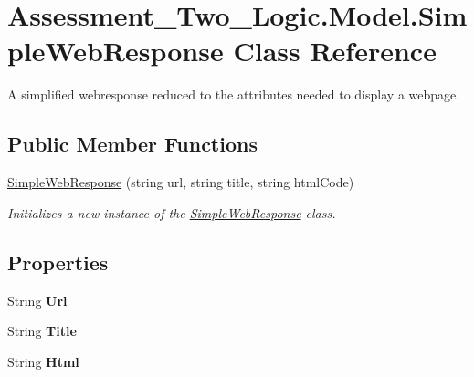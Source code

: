 \hypertarget{class_assessment___two___logic_1_1_model_1_1_simple_web_response}{
\section{Assessment\_\-Two\_\-Logic.Model.SimpleWebResponse Class Reference}
\label{class_assessment___two___logic_1_1_model_1_1_simple_web_response}
}


A simplified webresponse reduced to the attributes needed to display a webpage.  


\subsection*{Public Member Functions}
\begin{DoxyCompactItemize}
\item 
\hyperlink{class_assessment___two___logic_1_1_model_1_1_simple_web_response_a2ab4d7653df5dfba114ee891d7c5180e}{SimpleWebResponse} (string url, string title, string htmlCode)
\begin{DoxyCompactList}\small\item\em Initializes a new instance of the \hyperlink{class_assessment___two___logic_1_1_model_1_1_simple_web_response}{SimpleWebResponse} class. \item\end{DoxyCompactList}\end{DoxyCompactItemize}
\subsection*{Properties}
\begin{DoxyCompactItemize}
\item 
\hypertarget{class_assessment___two___logic_1_1_model_1_1_simple_web_response_a3937401d8de5b1ad9f7f77cb1db6a5f8}{
String {\bfseries Url}}
\label{class_assessment___two___logic_1_1_model_1_1_simple_web_response_a3937401d8de5b1ad9f7f77cb1db6a5f8}

\item 
\hypertarget{class_assessment___two___logic_1_1_model_1_1_simple_web_response_a7597f75838792fc86ba110b02c254282}{
String {\bfseries Title}}
\label{class_assessment___two___logic_1_1_model_1_1_simple_web_response_a7597f75838792fc86ba110b02c254282}

\item 
\hypertarget{class_assessment___two___logic_1_1_model_1_1_simple_web_response_ab769603d96593ed99422339adfb8e8ab}{
String {\bfseries Html}}
\label{class_assessment___two___logic_1_1_model_1_1_simple_web_response_ab769603d96593ed99422339adfb8e8ab}

\end{DoxyCompactItemize}


